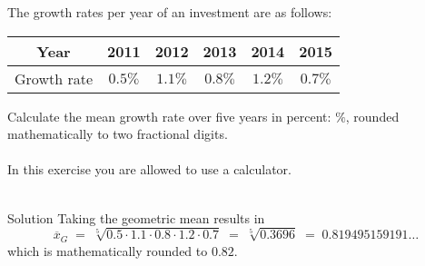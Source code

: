 \begin{MIntro}
\begin{MExercise}
The growth rates per year of an investment are as follows:
\begin{center}
\begin{tabular}{|c|c|c|c|c|c|}
\hline
Year         & 2011 & 2012 & 2013 & 2014 & 2015 \\ \hline
Growth rate  & $0.5\%$ & $1.1\%$ & $0.8\%$ & $1.2\%$ &  $0.7\%$ \\ \hline
\end{tabular}
\end{center}
Calculate the mean growth rate over five years in percent:
 $\%$, 
rounded mathematically to two fractional digits.
\ \\ \ \\
In this exercise you are allowed to use a calculator.
\ \\ \ \\
\begin{MHint}{Solution}
Taking the geometric mean results in 
$$
\overline{x}_G\; =\; \sqrt[5]{0.5\cdot 1.1\cdot 0.8\cdot 1.2\cdot 0.7}\; =\; \sqrt[5]{0.3696}\; =\; 0.819495159191\ldots
$$
which is mathematically rounded to $0.82$.
\end{MHint}
\end{MExercise}

\end{MIntro}

